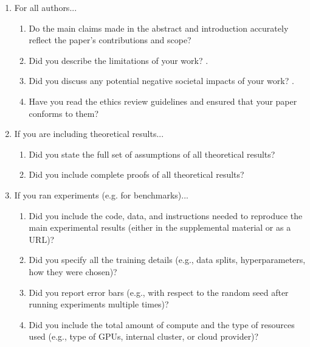 \documentclass{article}
\begin{document}
\begin{enumerate}

\item For all authors...
\begin{enumerate}
  \item Do the main claims made in the abstract and introduction accurately reflect the paper's contributions and scope?
    \answerYes{}
  \item Did you describe the limitations of your work?
     .
  \item Did you discuss any potential negative societal impacts of your work?
   .
  \item Have you read the ethics review guidelines and ensured that your paper conforms to them?
    \answerYes{}
\end{enumerate}

\item If you are including theoretical results...
\begin{enumerate}
  \item Did you state the full set of assumptions of all theoretical results?
    \answerNA{}
	\item Did you include complete proofs of all theoretical results?
    \answerNA{}
\end{enumerate}

\item If you ran experiments (e.g. for benchmarks)...
\begin{enumerate}
  \item Did you include the code, data, and instructions needed to reproduce the main experimental results (either in the supplemental material or as a URL)?
  \item Did you specify all the training details (e.g., data splits, hyperparameters, how they were chosen)?
	\item Did you report error bars (e.g., with respect to the random seed after running experiments multiple times)?
	\item Did you include the total amount of compute and the type of resources used (e.g., type of GPUs, internal cluster, or cloud provider)?
\end{enumerate}


\end{enumerate}
\end{document}
